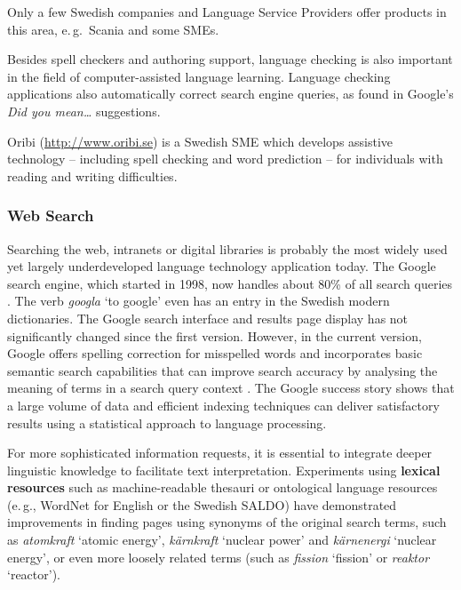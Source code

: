 \begin{multicols}{2}

Only a few Swedish companies and Language Service Providers offer products in this area, e.\,g.~Scania and some SMEs.

Besides spell checkers and authoring support, language checking is also important in the field of computer-assisted language learning. Language checking applications also automatically correct search engine queries, as found in Google's \textit{Did you mean…} suggestions.

Oribi (\url{http://www.oribi.se}) is a Swedish SME which develops
assistive technology -- including spell checking and word prediction
-- for individuals with reading and writing difficulties.

\subsubsection{Web Search}

Searching the web, intranets or digital libraries is probably the most widely used yet largely underdeveloped language technology application today. The Google search engine, which started in 1998, now handles about 80\% of all search queries \cite{spi1}. The verb \textit{googla} `to google' even has an entry in the Swedish modern dictionaries. The Google search interface and results page display has not significantly changed since the first version. However, in the current version, Google offers spelling correction for misspelled words and incorporates basic semantic search capabilities that can improve search accuracy by analysing the meaning of terms in a search query context \cite{pc1}. The Google success story shows that a large volume of data and efficient indexing techniques can deliver satisfactory results using a statistical approach to language processing. 


For more sophisticated information requests, it is essential to
integrate deeper linguistic knowledge to facilitate text
interpretation. Experiments using \textbf{lexical resources} such as
machine-readable thesauri or ontological language resources (e.\,g.,
WordNet for English or the Swedish
SALDO\cite{saldo1}) have
demonstrated improvements in finding pages using synonyms of the
original search terms, such as \textit{atomkraft} `atomic energy',
\textit{kärnkraft} `nuclear power' and \textit{kärnenergi} `nuclear
energy', or even more loosely related terms (such as \textit{fission}
`fission' or \textit{reaktor} `reactor').


\end{multicols}

